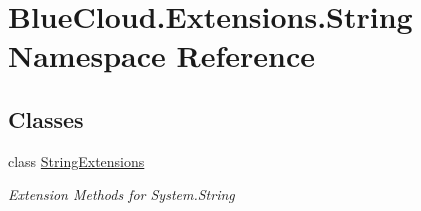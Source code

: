 \hypertarget{namespace_blue_cloud_1_1_extensions_1_1_string}{}\section{Blue\+Cloud.\+Extensions.\+String Namespace Reference}
\label{namespace_blue_cloud_1_1_extensions_1_1_string}
\subsection*{Classes}
\begin{DoxyCompactItemize}
\item 
class \mbox{\hyperlink{class_blue_cloud_1_1_extensions_1_1_string_1_1_string_extensions}{String\+Extensions}}
\begin{DoxyCompactList}\small\item\em Extension Methods for System.\+String \end{DoxyCompactList}\end{DoxyCompactItemize}

